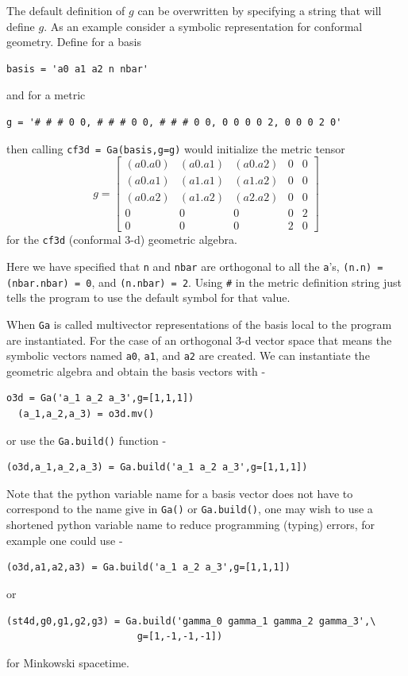 \documentclass[12pt,twoside,openright]{memoir}
\newcommand{\lbrk}{\left [}
\newcommand{\rbrk}{\right ]}
\newcommand{\T}[1]{\texttt{#1}}
\begin{document}
The default definition of $g$ can be overwritten by specifying a string
that will define $g$. As an example consider a symbolic representation
for conformal geometry. Define for a basis
\begin{lstlisting}[numbers=none]
  basis = 'a0 a1 a2 n nbar'
\end{lstlisting}
and for a metric
\begin{lstlisting}[numbers=none]
  g = '# # # 0 0, # # # 0 0, # # # 0 0, 0 0 0 0 2, 0 0 0 2 0'
\end{lstlisting}
then calling \T{cf3d = Ga(basis,g=g)} would initialize the metric tensor
  \begin{equation}
  g = \lbrk
  \begin{array}{ccccc}
    (a0.a0) & (a0.a1)  & (a0.a2) & 0 & 0\\
    (a0.a1) & (a1.a1)  & (a1.a2) & 0 & 0\\
    (a0.a2) & (a1.a2)  & (a2.a2) & 0 & 0 \\
    0 & 0 & 0 & 0 & 2 \\
    0 & 0 & 0 & 2 & 0
  \end{array}
  \rbrk
  \end{equation}
for the  \T{cf3d} (conformal 3-d) geometric algebra.

Here we have specified that \T{n} and \T{nbar} are orthogonal to all the
\T{a}'s, \T{(n.n) = (nbar.nbar) = 0}, and \T{(n.nbar) = 2}. Using
\T{\#} in the metric definition string just tells the program to use the
default symbol for that value.

When \T{Ga} is called multivector representations of the basis local to
the program are instantiated.  For the case of an orthogonal 3-d vector 
space that means the
symbolic vectors named \T{a0}, \T{a1}, and \T{a2} are created. We can 
instantiate the geometric algebra and obtain the basis vectors with -
\begin{lstlisting}[numbers=none]
  o3d = Ga('a_1 a_2 a_3',g=[1,1,1])
  (a_1,a_2,a_3) = o3d.mv()
\end{lstlisting}
or use the \T{Ga.build()} function -
\begin{lstlisting}[numbers=none]
  (o3d,a_1,a_2,a_3) = Ga.build('a_1 a_2 a_3',g=[1,1,1])
\end{lstlisting}
Note that the python variable name for a basis vector does not have to
correspond to the name give in \T{Ga()} or \T{Ga.build()}, one may wish to use a
shortened python variable name to reduce programming (typing) errors, for
example one could use -
\begin{lstlisting}[numbers=none]
  (o3d,a1,a2,a3) = Ga.build('a_1 a_2 a_3',g=[1,1,1])
\end{lstlisting}
or
\begin{lstlisting}[numbers=none]
  (st4d,g0,g1,g2,g3) = Ga.build('gamma_0 gamma_1 gamma_2 gamma_3',\
                       g=[1,-1,-1,-1])
\end{lstlisting}
for Minkowski spacetime.
\end{document}
